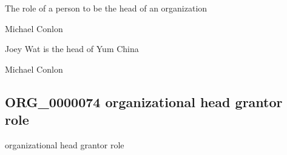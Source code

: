 \documentclass[letterpaper,10pt,english]{sphinxmanual}
\begin{document}
\begin{sphinxShadowBox}

\sphinxAtStartPar
{\hyperref[\detokenize{doc-BFO_0000023::doc}]{}}
\end{sphinxShadowBox}

\begin{sphinxShadowBox}

\sphinxAtStartPar
The role of a person to be the head of an organization
\end{sphinxShadowBox}

\begin{sphinxShadowBox}

\sphinxAtStartPar
Michael Conlon 
\end{sphinxShadowBox}

\begin{sphinxShadowBox}

\sphinxAtStartPar
Joey Wat is the head of Yum China
\end{sphinxShadowBox}

\begin{sphinxShadowBox}

\sphinxAtStartPar
Michael Conlon 
\end{sphinxShadowBox}
\begin{quote}

\ignorespaces \end{quote}


\subsection{ORG\_0000074 \sphinxhyphen{} organizational head grantor role}
\label{\detokenize{doc-ORG_0000074:org-0000074-organizational-head-grantor-role}}\label{\detokenize{doc-ORG_0000074:index-0}}\label{\detokenize{doc-ORG_0000074::doc}}
\begin{sphinxShadowBox}

\sphinxAtStartPar
organizational head grantor role
\end{sphinxShadowBox}
\end{document}
